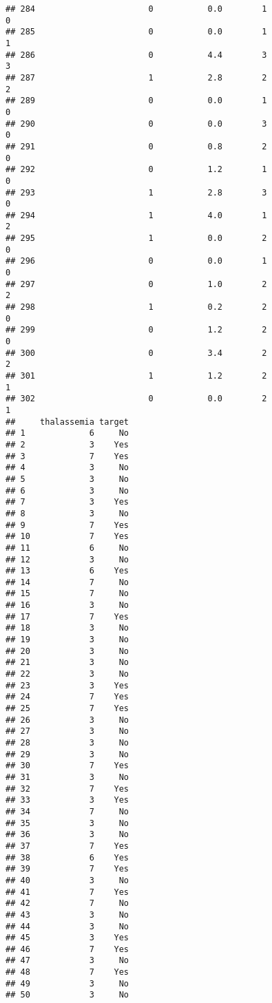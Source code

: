 \documentclass[]{article}
\begin{document}
\begin{verbatim}
## 284                       0           0.0        1                 0
## 285                       0           0.0        1                 1
## 286                       0           4.4        3                 3
## 287                       1           2.8        2                 2
## 289                       0           0.0        1                 0
## 290                       0           0.0        3                 0
## 291                       0           0.8        2                 0
## 292                       0           1.2        1                 0
## 293                       1           2.8        3                 0
## 294                       1           4.0        1                 2
## 295                       1           0.0        2                 0
## 296                       0           0.0        1                 0
## 297                       0           1.0        2                 2
## 298                       1           0.2        2                 0
## 299                       0           1.2        2                 0
## 300                       0           3.4        2                 2
## 301                       1           1.2        2                 1
## 302                       0           0.0        2                 1
##     thalassemia target
## 1             6     No
## 2             3    Yes
## 3             7    Yes
## 4             3     No
## 5             3     No
## 6             3     No
## 7             3    Yes
## 8             3     No
## 9             7    Yes
## 10            7    Yes
## 11            6     No
## 12            3     No
## 13            6    Yes
## 14            7     No
## 15            7     No
## 16            3     No
## 17            7    Yes
## 18            3     No
## 19            3     No
## 20            3     No
## 21            3     No
## 22            3     No
## 23            3    Yes
## 24            7    Yes
## 25            7    Yes
## 26            3     No
## 27            3     No
## 28            3     No
## 29            3     No
## 30            7    Yes
## 31            3     No
## 32            7    Yes
## 33            3    Yes
## 34            7     No
## 35            3     No
## 36            3     No
## 37            7    Yes
## 38            6    Yes
## 39            7    Yes
## 40            3     No
## 41            7    Yes
## 42            7     No
## 43            3     No
## 44            3     No
## 45            3    Yes
## 46            7    Yes
## 47            3     No
## 48            7    Yes
## 49            3     No
## 50            3     No

\end{verbatim}
\end{document}
